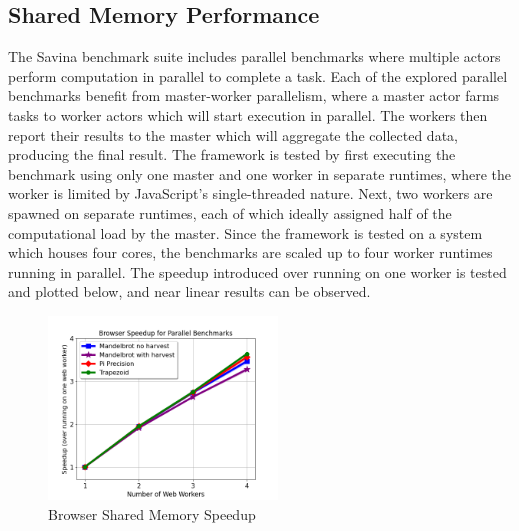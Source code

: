 \documentclass[lettersize,journal]{IEEEtran}
\begin{document}
\subsection{Shared Memory Performance}
The Savina benchmark suite includes parallel benchmarks where multiple actors perform computation in parallel to complete a task. Each of the explored parallel benchmarks benefit from master-worker parallelism, where a master actor farms tasks to worker actors which will start execution in parallel. The workers then report their results to the master which will aggregate the collected data, producing the final result. The framework is tested by first executing the benchmark using only one master and one worker in separate runtimes, where the worker is limited by JavaScript's single-threaded nature.  Next, two workers are spawned on separate runtimes, each of which ideally assigned half of the computational load by the master. Since the framework is tested on a system which houses four cores, the benchmarks are scaled up to four worker runtimes running in parallel. The speedup introduced over running on one worker is tested and plotted below, and near linear results can be observed.
\begin{figure}[H]
    \begin{centering}
        \includegraphics[width=230px]{resources/browser_speedup.png}
        \caption{Browser Shared Memory Speedup}
    \end{centering}
\end{figure}
\end{document}
